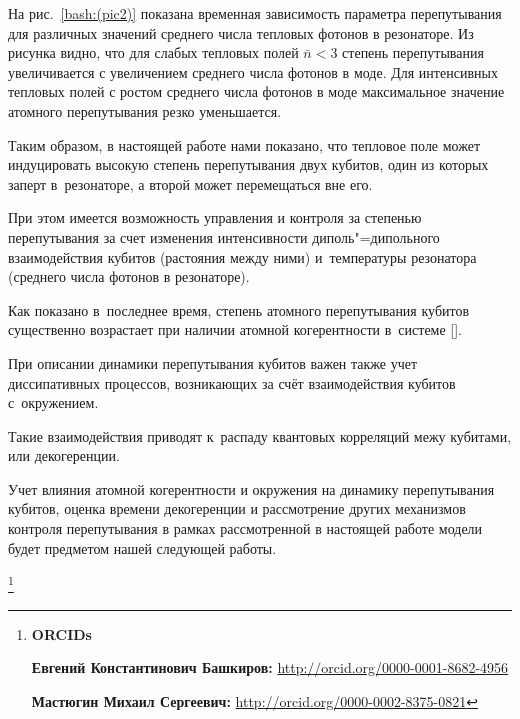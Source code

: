 На рис.~\ref{bash:(pic2)} показана временная   зависимость параметра перепутывания для различных значений среднего числа тепловых фотонов в резонаторе. Из рисунка видно,  что для слабых тепловых полей $\bar n <3$   степень перепутывания увеличивается с увеличением среднего числа фотонов в моде. Для интенсивных тепловых полей с ростом среднего числа фотонов в моде максимальное значение атомного перепутывания резко уменьшается.





Таким образом, в настоящей работе нами показано, что тепловое поле может индуцировать высокую степень перепутывания двух кубитов, один из которых заперт в~резонаторе, а второй может перемещаться вне его. 

При этом имеется возможность управления и контроля за степенью перепутывания за счет изменения интенсивности диполь"=дипольного взаимодействия кубитов (растояния между ними) и~температуры резонатора (среднего числа фотонов в резонаторе). 

Как показано в~последнее время, степень атомного перепутывания кубитов существенно возрастает при наличии атомной когерентности в~системе []. 

При описании динамики перепутывания кубитов важен также учет диссипативных процессов, возникающих за счёт взаимодействия кубитов с~окружением. 

Такие взаимодействия приводят к~распаду квантовых корреляций межу кубитами, или декогеренции. 

Учет влияния атомной когерентности и окружения на динамику перепутывания  кубитов, оценка времени декогеренции и рассмотрение других механизмов контроля перепутывания в рамках рассмотренной в настоящей работе модели будет предметом нашей следующей работы.



\thanks{{\bf ORCIDs}



{\bf Евгений Константинович Башкиров:} \url{http://orcid.org/0000-0001-8682-4956}



{\bf Мастюгин Михаил Сергеевич:} \url{http://orcid.org/0000-0002-8375-0821}







}



\RusRef



